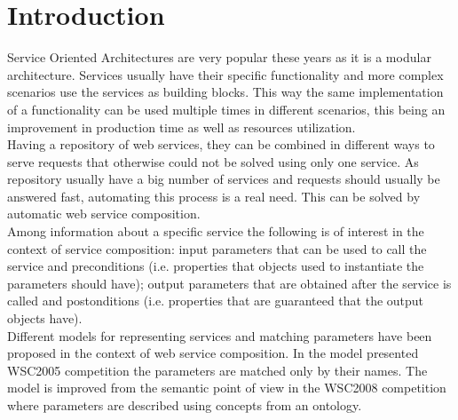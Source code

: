 \documentclass[12pt]{article}
\theoremstyle{definition}
\begin{document}
\section{Introduction}
Service Oriented Architectures are very popular these years as it is a modular architecture. Services usually have their specific functionality and more complex scenarios use the services as building blocks. This way the same implementation of a functionality can be used multiple times in different scenarios, this being an improvement in production time as well as resources utilization.
\\
Having a repository of web services, they can be combined in different ways to serve requests that otherwise could not be solved using only one service. As repository usually have a big number of services and requests should usually be answered fast, automating this process is a real need. This can be solved by automatic web service composition. \\ 
Among information about a specific service the following is of interest in the context of service composition: input parameters that can be used to call the service and preconditions (i.e. properties that objects used to instantiate the parameters should have); output parameters that are obtained after the service is called and postonditions (i.e. properties that are guaranteed that the output objects have). \\
Different models for representing services and matching parameters have been proposed in the context of web service composition. In the model presented WSC2005 competition the parameters are matched only by their names. The model is improved from the semantic point of view in the WSC2008 competition \cite{WSC2008} where parameters are described using concepts from an ontology. \\
\end{document}
